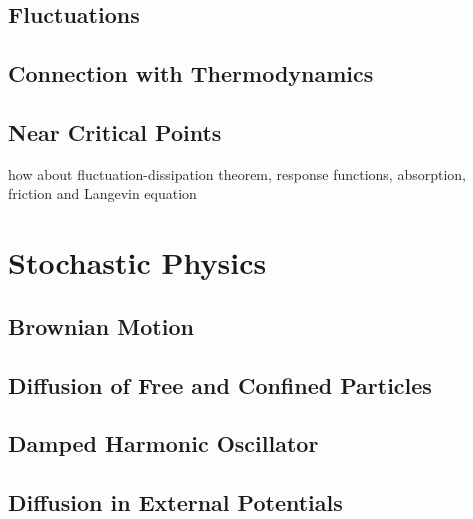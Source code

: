 \documentclass[a4paper]{article}
\theoremstyle{new}
\begin{document}
\subsection{Fluctuations}
\subsection{Connection with Thermodynamics}
\subsection{Near Critical Points}

how about fluctuation-dissipation theorem, response functions, absorption, friction and Langevin equation

\newpage
\section{Stochastic Physics}
\subsection{Brownian Motion}
\subsection{Diffusion of Free and Confined Particles}
\subsection{Damped Harmonic Oscillator}
\subsection{Diffusion in External Potentials}

\appendix
\newpage


\end{document}

